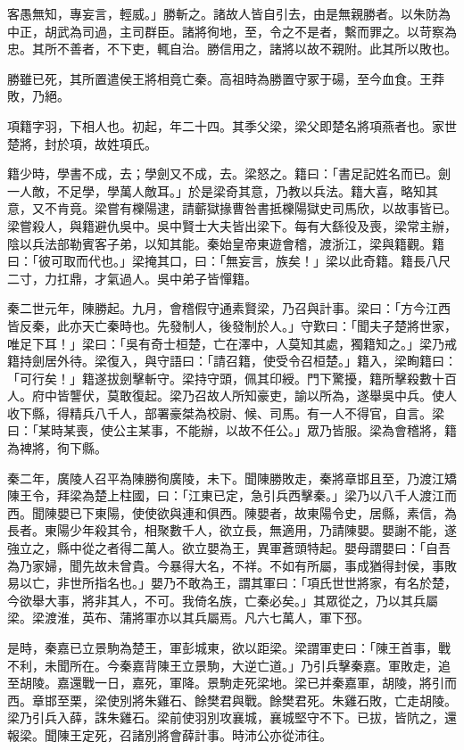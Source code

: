 \begin{pinyinscope}
客愚無知，專妄言，輕威。」勝斬之。諸故人皆自引去，由是無親勝者。以朱防為中正，胡武為司過，主司群臣。諸將徇地，至，令之不是者，繫而罪之。以苛察為忠。其所不善者，不下吏，輒自治。勝信用之，諸將以故不親附。此其所以敗也。

勝雖已死，其所置遣侯王將相竟亡秦。高祖時為勝置守冢于碭，至今血食。王莽敗，乃絕。

項籍字羽，下相人也。初起，年二十四。其季父梁，梁父即楚名將項燕者也。家世楚將，封於項，故姓項氏。

籍少時，學書不成，去；學劍又不成，去。梁怒之。籍曰：「書足記姓名而已。劍一人敵，不足學，學萬人敵耳。」於是梁奇其意，乃教以兵法。籍大喜，略知其意，又不肯竟。梁嘗有櫟陽逮，請蘄獄掾曹咎書抵櫟陽獄史司馬欣，以故事皆已。梁嘗殺人，與籍避仇吳中。吳中賢士大夫皆出梁下。每有大繇役及喪，梁常主辦，陰以兵法部勒賓客子弟，以知其能。秦始皇帝東遊會稽，渡浙江，梁與籍觀。籍曰：「彼可取而代也。」梁掩其口，曰：「無妄言，族矣！」梁以此奇籍。籍長八尺二寸，力扛鼎，才氣過人。吳中弟子皆憚籍。

秦二世元年，陳勝起。九月，會稽假守通素賢梁，乃召與計事。梁曰：「方今江西皆反秦，此亦天亡秦時也。先發制人，後發制於人。」守歎曰：「聞夫子楚將世家，唯足下耳！」梁曰：「吳有奇士桓楚，亡在澤中，人莫知其處，獨籍知之。」梁乃戒籍持劍居外待。梁復入，與守語曰：「請召籍，使受令召桓楚。」籍入，梁眴籍曰：「可行矣！」籍遂拔劍擊斬守。梁持守頭，佩其印綬。門下驚擾，籍所擊殺數十百人。府中皆讋伏，莫敢復起。梁乃召故人所知豪吏，諭以所為，遂舉吳中兵。使人收下縣，得精兵八千人，部署豪桀為校尉、候、司馬。有一人不得官，自言。梁曰：「某時某喪，使公主某事，不能辦，以故不任公。」眾乃皆服。梁為會稽將，籍為裨將，徇下縣。

秦二年，廣陵人召平為陳勝徇廣陵，未下。聞陳勝敗走，秦將章邯且至，乃渡江矯陳王令，拜梁為楚上柱國，曰：「江東已定，急引兵西擊秦。」梁乃以八千人渡江而西。聞陳嬰已下東陽，使使欲與連和俱西。陳嬰者，故東陽令史，居縣，素信，為長者。東陽少年殺其令，相聚數千人，欲立長，無適用，乃請陳嬰。嬰謝不能，遂強立之，縣中從之者得二萬人。欲立嬰為王，異軍蒼頭特起。嬰母謂嬰曰：「自吾為乃家婦，聞先故未曾貴。今暴得大名，不祥。不如有所屬，事成猶得封侯，事敗易以亡，非世所指名也。」嬰乃不敢為王，謂其軍曰：「項氏世世將家，有名於楚，今欲舉大事，將非其人，不可。我倚名族，亡秦必矣。」其眾從之，乃以其兵屬梁。梁渡淮，英布、蒲將軍亦以其兵屬焉。凡六七萬人，軍下邳。

是時，秦嘉已立景駒為楚王，軍彭城東，欲以距梁。梁謂軍吏曰：「陳王首事，戰不利，未聞所在。今秦嘉背陳王立景駒，大逆亡道。」乃引兵擊秦嘉。軍敗走，追至胡陵。嘉還戰一日，嘉死，軍降。景駒走死梁地。梁已并秦嘉軍，胡陵，將引而西。章邯至栗，梁使別將朱雞石、餘樊君與戰。餘樊君死。朱雞石敗，亡走胡陵。梁乃引兵入薛，誅朱雞石。梁前使羽別攻襄城，襄城堅守不下。已拔，皆阬之，還報梁。聞陳王定死，召諸別將會薛計事。時沛公亦從沛往。


\end{pinyinscope}
